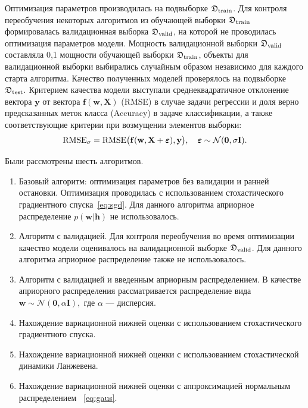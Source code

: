 Оптимизация параметров производилась на подвыборке $\mathfrak{D}_\textnormal{train}$. Для контроля переобучения некоторых алгоритмов из обучающей выборки $\mathfrak{D}_\textnormal{train}$ формировалась валидационная выборка $\mathfrak{D}_\textnormal{valid}$, на которой не проводилась оптимизация параметров  модели. Мощность валидационной выборки $\mathfrak{D}_\textnormal{valid}$ составляла 0,1 мощности обучающей выборки  $\mathfrak{D}_\textnormal{train}$, объекты для валидационной выборки выбирались случайным образом независимо для каждого старта алгоритма.
Качество полученных моделей проверялось на подвыборке $\mathfrak{D}_\textnormal{test}.$ Критерием качества модели выступали среднеквадратичное отклонение вектора $\mathbf{y}$ от вектора $\mathbf{f}(\mathbf{w}, \mathbf{X})$ (RMSE) {в случае задачи регрессии и доля верно предсказанных меток класса (Accuracy) в задаче классификации}, а также { соответствующие критерии } при возмущении элементов выборки:
\begin{equation}
\label{eq:rmse}
	\textnormal{RMSE}_{\sigma} =\textnormal{RMSE}\bigl(\mathbf{f}( \mathbf{w}, \mathbf{X}+\boldsymbol{\varepsilon}), \mathbf{y}\bigr),  \quad \boldsymbol{\varepsilon} \sim \mathcal{N}(\mathbf{0}, \sigma \mathbf{I}).
\end{equation}

Были рассмотрены шесть алгоритмов.
\begin{enumerate}
\item Базовый алгоритм: оптимизация параметров без валидации и ранней остановки. Оптимизация проводилась с использованием стохастического градиентного спуска~\eqref{eq:sgd}. Для данного алгоритма априорное распределение $p(\mathbf{w}|\mathbf{h})$ не использовалось.
\item Алгоритм с валидацией. Для контроля переобучения во время оптимизации качество модели оценивалось на валидационной выборке $\mathfrak{D}_\textnormal{valid}$. Для данного алгоритма априорное распределение также не использовалось.
\item Алгоритм с валидацией и введенным априорным распределением. В качестве априорного распределения рассматривается распределение вида
$
	\mathbf{w} \sim \mathcal{N}(\mathbf{0}, \alpha \mathbf{I}), 
$
где $\alpha$ --- дисперсия.

\item Нахождение вариационной нижней оценки с использованием стохастического градиентного спуска.
\item Нахождение вариационной нижней оценки с использованием стохастической динамики Ланжевена.
\item Нахождение вариационной нижней оценки с аппроксимацией нормальным распределением ~\eqref{eq:gaus}.
\end{enumerate}





